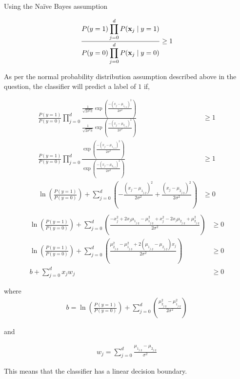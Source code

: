 Using the Na\"ive Bayes assumption

\begin{equation*}
\begin{aligned}
\frac{P(y=1) \displaystyle \prod_{j=0}^{d} P({\bf x}_j  \mid y=1) }{ P(y=0) \displaystyle \prod_{j=0}^{d} P({\bf x}_j \mid y=0)} \geq 1
\end{aligned}
\end{equation*}

As per the normal probability distribution assumption described above in the question, the classifier will predict a label of $1$ if,

\begin{equation*}
\begin{aligned}
\frac{P(y=1)}{P(y=0)} \displaystyle \prod_{j=0}^{d}  \frac{ \frac{1}{\sqrt{2 \sigma^2 \pi}} \exp\left(\frac{-\left(x_j - \mu_{1_{j,y}}\right)^2}{2\sigma^2}\right)}{   \frac{1}{\sqrt{2 \sigma^2 \pi}} \exp\left(\frac{-\left(x_j - \mu_{2_{j,y}}\right)^2}{2\sigma^2}\right)} &\geq 1\\
\frac{P(y=1)}{P(y=0)} \displaystyle \prod_{j=0}^{d} \frac{\exp\left(\frac{-\left(x_j - \mu_{1_{j,y}}\right)^2}{2\sigma^2}\right)}{\exp\left(\frac{-\left(x_j - \mu_{2_{j,y}}\right)^2}{2\sigma^2}\right)} &\geq 1\\
\ln \left( \frac{P(y=1)}{P(y=0)}\right) + \displaystyle \sum_{j=0}^{d} \left(  - \frac{\left( x_j - \mu_{1_{j,y}} \right)^2}{2\sigma^2} + \frac{\left( x_j - \mu_{2_{j,y}} \right)^2}{2\sigma^2} \right) &\geq 0\\
\end{aligned}
\end{equation*}
\begin{equation*}
\begin{aligned}
\ln \left( \frac{P(y=1)}{P(y=0)}\right) + \displaystyle \sum_{j=0}^{d} \left(  \frac{-x_j^2 + 2x_j\mu_{1_{j,y}} - \mu_{1_{j,y}}^2 + x_j^2 - 2x_j\mu_{2_{j,y}} + \mu_{2_{j,y}}^2 }{2\sigma^2} \right) &\geq 0\\
\ln \left( \frac{P(y=1)}{P(y=0)}\right) + \displaystyle \sum_{j=0}^{d} \left(  \frac{\mu_{2_{j,y}}^2  - \mu_{1_{j,y}}^2 + 2(\mu_{1_{j,y}} - \mu_{2_{j,y}})x_j  }{2\sigma^2} \right) &\geq 0\\
b + \displaystyle \sum_{j=0}^{d} x_j w_j &\geq 0
\end{aligned}
\end{equation*}

where 
\begin{equation*}
\begin{aligned}
b=\ln \left( \frac{P(y=1)}{P(y=0)}\right) + \displaystyle \sum_{j=0}^{d} \left(  \frac{\mu_{2_{j,y}}^2  - \mu_{1_{j,y}}^2 }{2\sigma^2} \right) 
\end{aligned}
\end{equation*}

and

\begin{equation*}
\begin{aligned}
w_j = \displaystyle \sum_{j=0}^{d} \frac{\mu_{1_{j,y}} - \mu_{2_{j,y}}}{\sigma^2}
\end{aligned}
\end{equation*}

This means that the classifier has a linear decision boundary.
